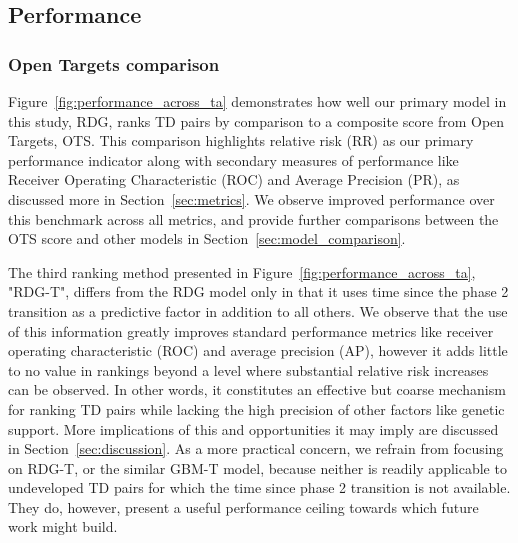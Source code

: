 \documentclass{article}
\begin{document}
\subsection{Performance}
\label{sec:results_performance}

\subsubsection{Open Targets comparison}

Figure~\ref{fig:performance_across_ta} demonstrates how well our primary model in this study, RDG, ranks TD pairs by comparison to a composite score from Open Targets, OTS. This comparison highlights relative risk (RR) as our primary performance indicator along with secondary measures of performance like Receiver Operating Characteristic (ROC) and Average Precision (PR), as discussed more in Section~\ref{sec:metrics}. We observe improved performance over this benchmark across all metrics, and provide further comparisons between the OTS score and other models in Section~\ref{sec:model_comparison}.

The third ranking method presented in Figure~\ref{fig:performance_across_ta}, "RDG-T", differs from the RDG model only in that it uses time since the phase 2 transition as a predictive factor in addition to all others. We observe that the use of this information greatly improves standard performance metrics like receiver operating characteristic (ROC) and average precision (AP), however it adds little to no value in rankings beyond a level where substantial relative risk increases can be observed. In other words, it constitutes an effective but coarse mechanism for ranking TD pairs while lacking the high precision of other factors like genetic support. More implications of this and opportunities it may imply are discussed in Section~\ref{sec:discussion}. As a more practical concern, we refrain from focusing on RDG-T, or the similar GBM-T model, because neither is readily applicable to undeveloped TD pairs for which the time since phase 2 transition is not available. They do, however, present a useful performance ceiling towards which future work might build.
\end{document}
